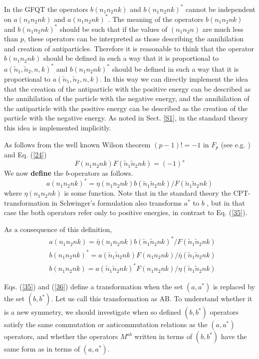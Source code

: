\documentclass[a4paper,12pt]{article}%
\begin{document}
In the GFQT the operators $b(n_1n_2nk)$ and 
$b(n_1n_2nk)^*$ cannot be independent on
$a(n_1n_2nk)$ and $a(n_1n_2nk)^*$. The meaning of
the operators $b(n_1n_2nk)$ and $b(n_1n_2nk)^*$
should be such that if the values of $(n_1n_2n)$ are
much less than $p$, these operators can be interpreted
as those describing the annihilation and creation of
antiparticles. Therefore it is reasonable to think that the 
operator $b(n_1n_2nk)$ should be defined in such a way that
it is proportional to $a({\tilde n}_1,{\tilde n}_2,n,k)^*$
and $b(n_1n_2nk)^*$ should be defined in such a way that
it is proportional to $a({\tilde n}_1,{\tilde n}_2,n,k)$. 
In this way we can directly implement the idea that the
creation of the antiparticle with the positive energy
can be described as the annihilation of the particle with the
negative energy, and the annihilation of the antiparticle 
with the positive energy can be described as the creation of 
the particle with the negative energy. As noted in Sect.
\ref{S1}, in the standard theory this idea is implemented 
implicitly.   

As follows from the well known Wilson
theorem $(p-1)!=-1$ in $F_p$ (see e.g. \cite{VDW,IR})
and Eq. (\ref{24})
\begin{equation}
F(n_1n_2nk)F({\tilde n}_1{\tilde n}_2nk) = (-1)^s
\label{34}
\end{equation}   
We now {\bf define} the $b$-operators as follows. 
\begin{equation}
a(n_1n_2nk)^*=\eta(n_1n_2nk) b({\tilde n}_1{\tilde n}_2nk)/
F({\tilde n}_1{\tilde n}_2nk) 
\label{35}
\end{equation}
where $\eta(n_1n_2nk)$ is some function. 
Note that in the standard theory the 
CPT-transformation in Schwinger's formulation also transforms 
$a^*$ to $b$ \cite{AB,Wein}, but in that case the 
both operators refer only to positive energies, in contrast to 
Eq. (\ref{35}). 

As a consequence of this definition, 
\begin{eqnarray}
&a(n_1n_2nk)=\bar{\eta}(n_1n_2nk) b({\tilde n}_1{\tilde n}_2nk)^*/
F({\tilde n}_1{\tilde n}_2nk)\nonumber\\ 
&b(n_1n_2nk)^*=a({\tilde n}_1{\tilde n}_2nk)
F(n_1n_2nk)/{\bar \eta}({\tilde n}_1{\tilde n}_2nk)\nonumber\\ 
&b(n_1n_2nk)=a({\tilde n}_1{\tilde n}_2nk)^*
F(n_1n_2nk)/\eta({\tilde n}_1{\tilde n}_2nk)
\label{36}
\end{eqnarray}

Eqs. (\ref{35}) and (\ref{36}) define a transformation when the 
set $(a,a^*)$
is replaced by the set $(b,b^*)$. Let us call this transformation
as AB. To understand whether it is
a new symmetry, we should investigate when so defined $(b,b^*)$
operators satisfy the same commutation or anticommutation
relations as the $(a,a^*)$ operators, and whether the
operators $M^{ab}$ written in terms of $(b,b^*)$ have the
same form as in terms of $(a,a^*)$. 
\end{document}
